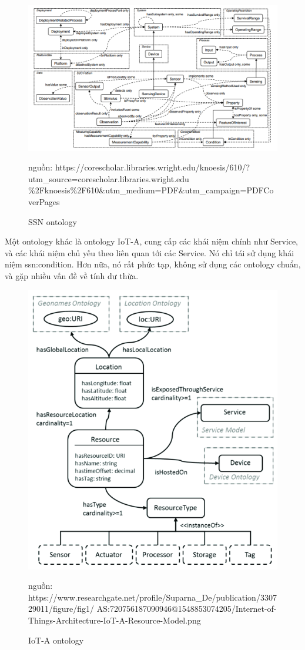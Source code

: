 \begin{figure}[h!]
	\center
	\includegraphics[scale=0.4]{image/ssn_ontology} \\
	\caption{SSN ontology}
	\small nguồn: https://corescholar.libraries.wright.edu/knoesis/610/?utm\_source=corescholar.libraries.wright.edu \%2Fknoesis\%2F610\&utm\_medium=PDF\&utm\_campaign=PDFCoverPages
\end{figure}

Một ontology khác là ontology IoT-A, cung cấp các khái niệm chính như Service, và các khái niệm chủ yếu theo liên quan tới các Service. Nó chỉ tái sử dụng khái niệm ssn:condition. Hơn nữa, nó rất phức tạp, không sử dụng các ontology chuẩn, và gặp nhiều vấn đề về tính dư thừa. 
\clearpage

\begin{figure}[h!]
	\center
	\includegraphics[scale=0.5]{image/iot-a}
	\caption{IoT-A ontology}
	nguồn: https://www.researchgate.net/profile/Suparna\_De/publication/330729011/figure/fig1/ AS:720756187090946@1548853074205/Internet-of-Things-Architecture-IoT-A-Resource-Model.png
\end{figure}

